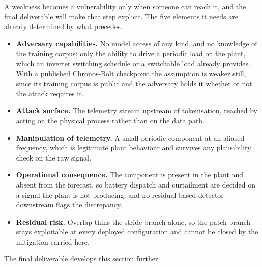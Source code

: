 A weakness becomes a vulnerability only when someone can reach it, and the final deliverable will make that step explicit. The five elements it needs are already determined by what precedes.

\begin{itemize}\setlength{\itemsep}{2pt}
    \item \textbf{Adversary capabilities.} No model access of any kind, and no knowledge of the training corpus; only the ability to drive a periodic load on the plant, which an inverter switching schedule or a switchable load already provides. With a published Chronos-Bolt checkpoint the assumption is weaker still, since its training corpus is public and the adversary holds it whether or not the attack requires it.
    \item \textbf{Attack surface.} The telemetry stream upstream of tokenisation, reached by acting on the physical process rather than on the data path.
    \item \textbf{Manipulation of telemetry.} A small periodic component at an aliased frequency, which is legitimate plant behaviour and survives any plausibility check on the raw signal.
    \item \textbf{Operational consequence.} The component is present in the plant and absent from the forecast, so battery dispatch and curtailment are decided on a signal the plant is not producing, and no residual-based detector downstream flags the discrepancy.
    \item \textbf{Residual risk.} Overlap thins the stride branch alone, so the patch branch stays exploitable at every deployed configuration and cannot be closed by the mitigation carried here.
\end{itemize}


The final deliverable develops this section further.
